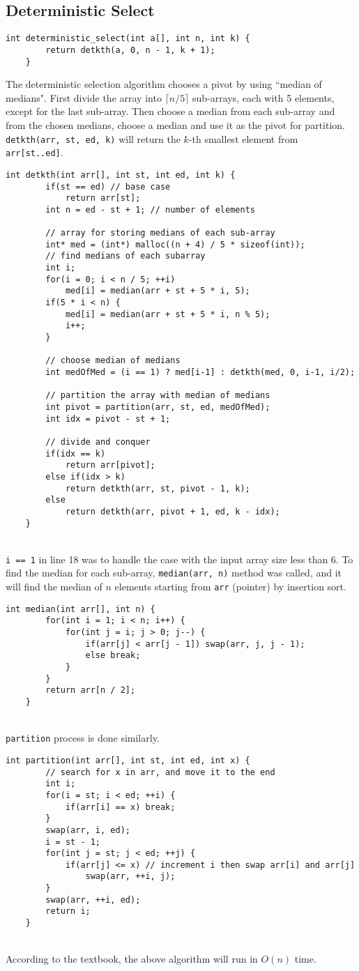 \documentclass[12pt]{article}
\begin{document}
\subsection{Deterministic Select}
\begin{lstlisting}[style=Cstyle]
	int deterministic_select(int a[], int n, int k) {
		return detkth(a, 0, n - 1, k + 1);
	}
\end{lstlisting}
The deterministic selection algorithm chooses a pivot by using ``median of medians". First divide the array into $\lceil n/5\rceil$ sub-arrays, each with 5 elements, except for the last sub-array. Then choose a median from each sub-array and from the chosen medians, choose a median and use it as the pivot for partition. \texttt{detkth(arr, st, ed, k)} will return the $k$-th smallest element from \texttt{arr[st..ed]}.
\begin{lstlisting}[style=Cstyle]
	int detkth(int arr[], int st, int ed, int k) {
	    if(st == ed) // base case
	    	return arr[st];
		int n = ed - st + 1; // number of elements
		
		// array for storing medians of each sub-array
		int* med = (int*) malloc((n + 4) / 5 * sizeof(int));
		// find medians of each subarray
		int i;
		for(i = 0; i < n / 5; ++i)
			med[i] = median(arr + st + 5 * i, 5);
		if(5 * i < n) {
			med[i] = median(arr + st + 5 * i, n % 5);
			i++;
		}
		
		// choose median of medians
		int medOfMed = (i == 1) ? med[i-1] : detkth(med, 0, i-1, i/2);
		
		// partition the array with median of medians
		int pivot = partition(arr, st, ed, medOfMed);
		int idx = pivot - st + 1;
		
		// divide and conquer
		if(idx == k)
			return arr[pivot];
		else if(idx > k)
			return detkth(arr, st, pivot - 1, k);
		else
			return detkth(arr, pivot + 1, ed, k - idx);
	}
\end{lstlisting}~\\
\texttt{i == 1} in line 18 was to handle the case with the input array size less than 6. To find the median for each sub-array, \texttt{median(arr, n)} method was called, and it will find the median of $n$ elements starting from \texttt{arr} (pointer) by insertion sort.
\begin{lstlisting}[style=Cstyle]
	int median(int arr[], int n) {
		for(int i = 1; i < n; i++) {
			for(int j = i; j > 0; j--) {
				if(arr[j] < arr[j - 1]) swap(arr, j, j - 1);    
				else break;
			}
		}
		return arr[n / 2];
	}
\end{lstlisting}~\\
\texttt{partition} process is done similarly.
\begin{lstlisting}[style=Cstyle]
	int partition(int arr[], int st, int ed, int x) {
		// search for x in arr, and move it to the end
		int i;
		for(i = st; i < ed; ++i) {
			if(arr[i] == x) break;
		}
		swap(arr, i, ed);
		i = st - 1;
		for(int j = st; j < ed; ++j) {
			if(arr[j] <= x) // increment i then swap arr[i] and arr[j]
				swap(arr, ++i, j);	
		}
		swap(arr, ++i, ed);
		return i;
	}
\end{lstlisting}~\\
According to the textbook, the above algorithm will run in $O(n)$ time.\\
\end{document}
